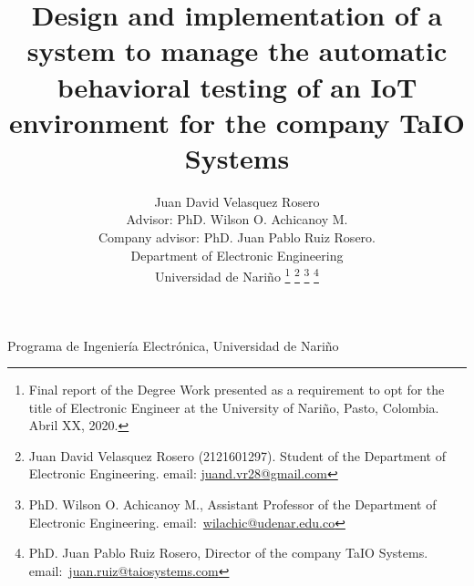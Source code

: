 \documentclass[journal]{IEEEtran}	%
\begin{document}
\title{Design and implementation of a system to manage the automatic behavioral testing of an IoT environment for the company TaIO Systems}

\author{Juan David Velasquez Rosero \\Advisor: PhD. Wilson O. Achicanoy M.\\Company advisor: PhD. Juan Pablo Ruiz Rosero.\\Department of Electronic Engineering\\
Universidad de Nariño %
\thanks{Final report of the Degree Work presented as a requirement to opt for the title of Electronic Engineer at the University of Nariño, Pasto, Colombia. Abril XX, 2020.}
\thanks{Juan David Velasquez Rosero (2121601297). Student of the Department of Electronic Engineering. email: \href{juand.vr28@gmail.com}{juand.vr28@gmail.com}}
\thanks{PhD. Wilson O. Achicanoy M., Assistant Professor of the Department of Electronic Engineering. email:~\href{wilachic@udenar.edu.co}{wilachic@udenar.edu.co}}
\thanks{PhD. Juan Pablo Ruiz Rosero, Director of the company TaIO Systems. email:~\href{juan.ruiz@taiosystems.com}{juan.ruiz@taiosystems.com}}}




%
{Programa de Ingeniería Electrónica, Universidad de Nariño}


\maketitle
\end{document}
